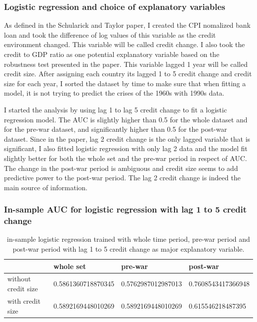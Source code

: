 \documentclass{article}
\begin{document}
\subsubsection*{Logistic regression and choice of explanatory variables}

As defined in the Schularick and Taylor paper, I created the CPI nomalized bank
loan and took the difference of log values of this variable as the credit environment changed. This variable will be called credit change. I also
took the credit to GDP ratio as one potential
explanatory variable based on the robustness test presented in the paper. This variable
lagged 1 year will be called credit size. After
assigning each country its lagged 1 to 5 credit change and credit size for each year, I
sorted the dataset by time to make sure that when fitting a model, it is
not trying to predict the crises of the 1960s with 1990s data.

I started the analysis by using lag 1 to lag 5 credit change to fit a
logistic regression model. The AUC is slightly higher than 0.5 for the whole
dataset and for the pre-war dataset, and significantly higher than 0.5
for the post-war dataset. Since in the paper, lag 2 credit change is the only
lagged variable that
is significant, I also fitted logistic regression with only lag 2 data
and the model fit slightly better for both the whole set and the pre-war period
in respect of AUC. The change in the post-war period is ambiguous and
credit size seems to add predictive power to the post-war period. The lag 2 credit
change is indeed the
main source of information.

\subsubsection*{\centering{}In-sample AUC for logistic regression with lag 1 to 5 credit change}

\begin{table}[H]
    \begin{center}\begin{tabular}{|l|l|l|l|}
    \hline
                        & whole set          & pre-war            & post-war           \\ \hline
    without credit size & 0.5861360718870345 & 0.5762987012987013 & 0.7608543417366948 \\ \hline
    with credit size    & 0.5892169448010269 & 0.5892169448010269 & 0.615546218487395 \\ \hline
    \end{tabular}\end{center}
    \caption{in-sample logistic regression trained with whole time period,
    pre-war period and post-war period with lag 1 to 5 credit change as major
    explanatory variable.}
\end{table}
\end{document}
